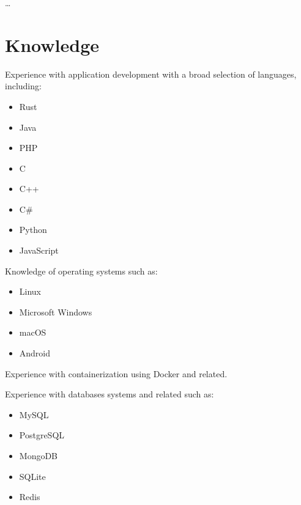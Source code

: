 \documentclass[]{friggeri-cv}
\providecommand{\tightlist}{%
\setlength{\itemsep}{0pt}\setlength{\parskip}{0pt}}
\begin{document}
\ldots{}

\newpage{}


\section{Knowledge}

Experience with application development with a broad selection of
languages, including:

\begin{multicols}{3}
\begin{itemize}
  \tightlist{}
  \item Rust
  \item Java
  \item PHP
  \item C
  \item C++
  \item C\#
  \item Python
  \item JavaScript
\end{itemize}
\end{multicols}

Knowledge of operating systems such as:

\begin{multicols}{3}
\begin{itemize}
  \tightlist{}
  \item Linux
  \item Microsoft Windows
  \item macOS
  \item Android
\end{itemize}
\end{multicols}

Experience with containerization using Docker and related.

Experience with databases systems and related such as:

\begin{multicols}{3}
\begin{itemize}
  \tightlist{}
  \item MySQL
  \item PostgreSQL
  \item MongoDB
  \item SQLite
  \item Redis
\end{itemize}
\end{multicols}
\end{document}
